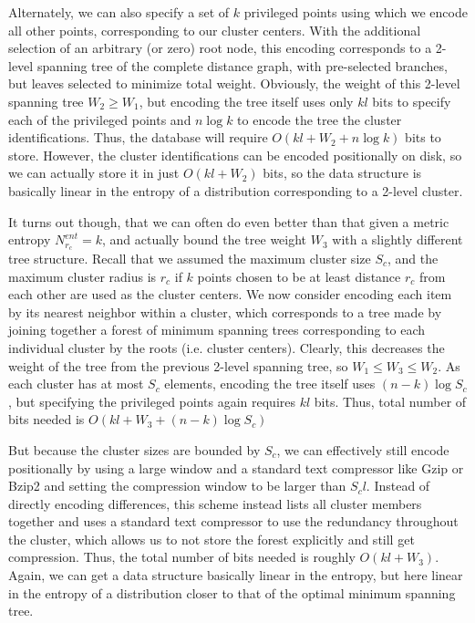 \documentclass[review,preprint,12pt]{elsarticle}
\theoremstyle{definition}
\theoremstyle{remark}
\numberwithin{equation}{section}
\begin{document}
Alternately, we can also specify a set of $k$ privileged points using which we encode all other points, corresponding to our cluster centers.
With the additional selection of an arbitrary (or zero) root node, this encoding corresponds to a 2-level spanning tree of the complete distance graph, with pre-selected branches, but leaves selected to minimize total weight.
Obviously, the weight of this 2-level spanning tree $W_2 \ge W_1$, but
encoding the tree itself uses only $kl$ bits to specify each of the privileged points and $n \log k$ to encode the tree the cluster identifications.
Thus, the database will require $O(kl + W_2 + n \log k)$ bits to store.
However, the cluster identifications can be encoded positionally on disk, so we can actually store it in just $O(kl + W_2)$ bits, so the data structure is basically linear in the entropy of a distribution corresponding to a 2-level cluster.

It turns out though, that we can often do even better than that given a metric entropy $N_{r_c}^{ent} = k$, and actually bound the tree weight $W_3$ with a slightly different tree structure.
Recall that we assumed the maximum cluster size $S_c$, and the maximum cluster radius is $r_c$ if $k$ points chosen to be at least distance $r_c$ from each other are used as the cluster centers.
We now consider encoding each item by its nearest neighbor within a cluster, which corresponds to a tree made by joining together a forest of minimum spanning trees corresponding to each individual cluster by the roots (i.e. cluster centers).
Clearly, this decreases the weight of the tree from the previous 2-level spanning tree, so $W_1 \le W_3 \le W_2$.
As each cluster has at most $S_c$ elements, encoding the tree itself uses $(n-k)\log S_c$, but specifying the privileged points again requires $kl$ bits.
Thus, total number of bits needed is $O(kl + W_3 + (n-k)\log S_c )$

But because the cluster sizes are bounded by $S_c$, we can effectively still encode positionally by using a large window and a standard text compressor like Gzip or Bzip2 and setting the compression window to be larger than $S_c l$.
Instead of directly encoding differences, this scheme instead lists all cluster members together and uses a standard text compressor to use the redundancy throughout the cluster, which allows us to not store the forest explicitly and still get compression.
Thus, the total number of bits needed is roughly $O(kl + W_3)$. Again, we can get a data structure basically linear in the entropy, but here linear in the entropy of a distribution closer to that of the optimal minimum spanning tree.
\end{document}
